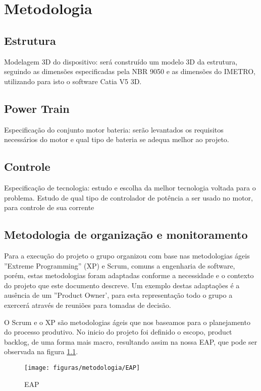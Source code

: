 \chapter[Metodologia]{Metodologia}


\section{Estrutura}

Modelagem 3D do dispositivo: será construído um modelo 3D da estrutura, seguindo as dimensões especificadas pela NBR 9050 \cite{nbr9050} e as dimensões do IMETRO, utilizando para isto o software Catia V5 3D.

\section{Power Train}

Especificação do conjunto motor bateria: serão levantados os requisitos necessários do motor e qual tipo de bateria se adequa melhor ao projeto.

\section{Controle}
  Especificação de tecnologia: estudo e escolha da melhor tecnologia voltada para o problema.
  Estudo de qual tipo de controlador de potência a ser usado no motor, para controle de sua corrente

\section{Metodologia de organização e monitoramento}

Para a execução do projeto o grupo organizou com base nas metodologias ágeis ''Extreme Programming'' (XP) e Scrum, comuns a engenharia de software, porém, estas metodologias foram adaptadas conforme a necessidade e o contexto do projeto que este documento descreve. Um exemplo destas adaptações é a ausência de um ''Product Owner', para esta representação todo o grupo a exercerá através de reuniões para tomadas de decisão.

O Scrum e o XP são metodologias ágeis que nos baseamos para o planejamento do processo produtivo. No inicio do projeto foi definido o escopo, product backlog, de uma forma mais macro, resultando assim na nossa EAP, que pode ser observada na figura \ref{fig:eap}.

\begin{figure}[!htb]
\centering
  \texttt{[image: figuras/metodologia/EAP]}
\caption{EAP}
\label{fig:eap}
\end{figure}

